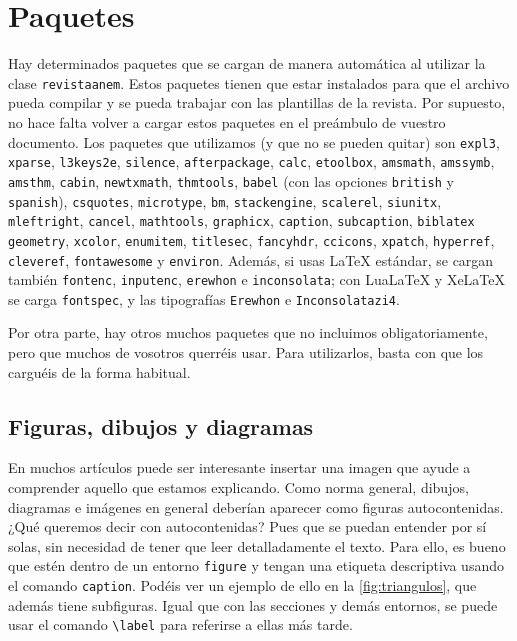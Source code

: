 \documentclass[bibtex, anon]{TEMat-article}
\begin{document}
\section{Paquetes}

Hay determinados paquetes que se cargan de manera automática al utilizar la clase \verb+revistaanem+.
Estos paquetes tienen que estar instalados para que el archivo pueda compilar y se pueda trabajar con las plantillas de la revista.
Por supuesto, no hace falta volver a cargar estos paquetes en el preámbulo de vuestro documento.
Los paquetes que utilizamos (y que no se pueden quitar) son \verb+expl3+, \verb+xparse+, \verb+l3keys2e+, \verb+silence+, \verb+afterpackage+, \verb+calc+, \verb+etoolbox+, \verb+amsmath+, \verb+amssymb+, \verb+amsthm+, \verb+cabin+, \verb+newtxmath+,  \verb+thmtools+, \verb+babel+ (con las opciones \verb+british+ y \verb+spanish+), \verb+csquotes+, \verb+microtype+, \verb+bm+, \verb+stackengine+, \verb+scalerel+, \verb+siunitx+, \verb+mleftright+, \verb+cancel+, \verb+mathtools+, \verb+graphicx+, \verb+caption+, \verb+subcaption+, \verb+biblatex+ \verb+geometry+, \verb+xcolor+, \verb+enumitem+, \verb+titlesec+, \verb+fancyhdr+, \verb+ccicons+, \verb+xpatch+, \verb+hyperref+, \verb+cleveref+, \verb+fontawesome+ y \verb+environ+.
Además, si usas LaTeX estándar, se cargan también \verb+fontenc+, \verb+inputenc+, \verb+erewhon+ e \verb+inconsolata+; con LuaLaTeX y XeLaTeX se carga \verb+fontspec+, y las tipografías \verb+Erewhon+ e \verb+Inconsolatazi4+.

Por otra parte, hay otros muchos paquetes que no incluimos obligatoriamente, pero que muchos de vosotros querréis usar.
Para utilizarlos, basta con que los carguéis de la forma habitual.

\subsection{Figuras, dibujos y diagramas}\label{sec:diagramas}
En muchos artículos puede ser interesante insertar una imagen que ayude a comprender aquello que estamos explicando.
Como norma general, dibujos, diagramas e imágenes en general deberían aparecer como figuras autocontenidas.
¿Qué queremos decir con autocontenidas?
Pues que se puedan entender por sí solas, sin necesidad de tener que leer detalladamente el texto.
Para ello, es bueno que estén dentro de un entorno \verb+figure+ y tengan una etiqueta descriptiva usando el comando \verb+caption+.
Podéis ver un ejemplo de ello en la \cref{fig:triangulos}, que además tiene subfiguras.
Igual que con las secciones y demás entornos, se puede usar el comando \verb+\label+ para referirse a ellas más tarde.
\end{document}
